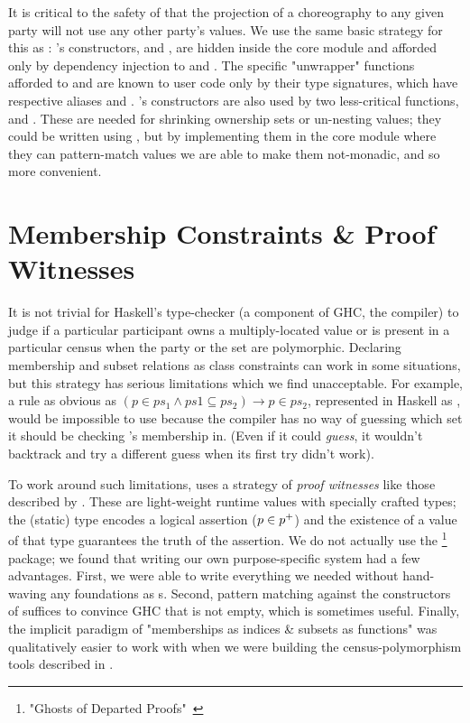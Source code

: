 It is critical to the safety of \MultiChor that the projection of a choreography to any given party will not use
any other party's  values.
We use the same basic strategy for this as \HasChor:
's constructors,  and , are hidden inside the core module
and afforded only by dependency injection to  and .
The specific "unwrapper" functions afforded to  and 
are known to user code only by their type signatures, which have respective aliases  and .
's constructors are also used by two less-critical functions,  and .
These are needed for shrinking ownership sets or un-nesting  values;
they could be written using ,
but by implementing them in the core module where they can pattern-match  values we are able to make them not-monadic,
and so more convenient.


\section{Membership Constraints \& Proof Witnesses}
\label{sec:membership}

It is not trivial for Haskell's type-checker (a component of GHC, the compiler) to judge if
a particular participant owns a multiply-located value or is present in a particular census
when the party or the set are polymorphic.
Declaring membership and subset relations as class constraints can work in some situations,
but this strategy has serious limitations which we find unacceptable.
For example, a rule as obvious as
$(p \in ps_1 \land ps1 \subseteq ps_2) \to p \in ps_2$,
represented in Haskell as
,
would be impossible to use because the compiler has no way of guessing which set 
it should be checking 's membership in.
(Even if it could \emph{guess}, it wouldn't backtrack and try a different guess when its first try didn't work).

To work around such limitations, \MultiChor uses a strategy of \emph{proof witnesses}
like those described by \cite{noonanGDP}.
These are light-weight runtime values with specially crafted types;
the (static) type encodes a logical assertion (\eg $p \in {p^{+}}$)
and the existence of a value of that type guarantees the truth of the assertion.
We do not actually use the \footnote{
    "Ghosts of Departed Proofs"~\cite{gdp_hackage}
} package; we found that writing our own purpose-specific system had a few advantages.
First, we were able to write everything we needed without hand-waving any foundations as s.
Second, pattern matching against the constructors of  suffices to convince GHC that  is not empty,
which is sometimes useful.
Finally, the implicit paradigm of "memberships as indices \& subsets as functions" was qualitatively easier to work with
when we were building the census-polymorphism tools described in .

